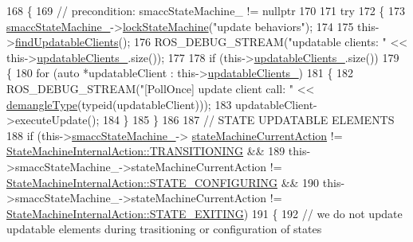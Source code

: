 \begin{DoxyCode}
168     \{
169         \textcolor{comment}{// precondition: smaccStateMachine\_ != nullptr}
170 
171         \textcolor{keywordflow}{try}
172         \{
173             \hyperlink{classsmacc_1_1SignalDetector_a46025de6ac7b5980e22144f9703236a4}{smaccStateMachine\_}->\hyperlink{classsmacc_1_1ISmaccStateMachine_a5c8d4c9a4b11c7950266a00e48080ce3}{lockStateMachine}(\textcolor{stringliteral}{"update behaviors"});
174 
175             this->\hyperlink{classsmacc_1_1SignalDetector_a47ec2df560e2e33758ce3975bece9385}{findUpdatableClients}();
176             ROS\_DEBUG\_STREAM(\textcolor{stringliteral}{"updatable clients: "} << this->\hyperlink{classsmacc_1_1SignalDetector_a01a457b4ec935473d6426efb7b87e683}{updatableClients\_}.size());
177 
178             \textcolor{keywordflow}{if} (this->\hyperlink{classsmacc_1_1SignalDetector_a01a457b4ec935473d6426efb7b87e683}{updatableClients\_}.size())
179             \{
180                 \textcolor{keywordflow}{for} (\textcolor{keyword}{auto} *updatableClient : this->\hyperlink{classsmacc_1_1SignalDetector_a01a457b4ec935473d6426efb7b87e683}{updatableClients\_})
181                 \{
182                     ROS\_DEBUG\_STREAM(\textcolor{stringliteral}{"[PollOnce] update client call:  "} << 
      \hyperlink{namespacesmacc_1_1introspection_a670e39ccea29952859df4e2d0e45077b}{demangleType}(\textcolor{keyword}{typeid}(updatableClient)));
183                     updatableClient->executeUpdate();
184                 \}
185             \}
186 
187             \textcolor{comment}{// STATE UPDATABLE ELEMENTS}
188             \textcolor{keywordflow}{if} (this->\hyperlink{classsmacc_1_1SignalDetector_a46025de6ac7b5980e22144f9703236a4}{smaccStateMachine\_}->
      \hyperlink{classsmacc_1_1ISmaccStateMachine_a654a98ba86c4c1013ac3c371f293d950}{stateMachineCurrentAction} != 
      \hyperlink{namespacesmacc_a0889aff43c93fe5285109819d2898144a5e174e130ee1847f37541ba5786207a3}{StateMachineInternalAction::TRANSITIONING} &&
189                 this->smaccStateMachine\_->stateMachineCurrentAction != 
      \hyperlink{namespacesmacc_a0889aff43c93fe5285109819d2898144a32406d3560b9f36b3e6e3b84454e1be5}{StateMachineInternalAction::STATE\_CONFIGURING} &&
190                 this->smaccStateMachine\_->stateMachineCurrentAction != 
      \hyperlink{namespacesmacc_a0889aff43c93fe5285109819d2898144a22bd5bb7935dd66f181d92efc273951e}{StateMachineInternalAction::STATE\_EXITING})
191             \{
192                 \textcolor{comment}{// we do not update updatable elements during trasitioning or configuration of states}

\end{DoxyCode}

